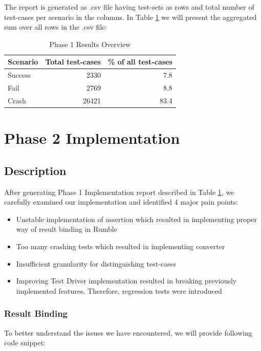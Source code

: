 The report is generated as .csv file having test-sets as rows and total number of test-cases per scenario in the columns. In Table \ref{tab:Phase1_ResultTable} we will present the aggregated sum over all rows in the .csv file:

\begin{table}[h!]
	\centering
	\begin{tabular}{|l|r|r|}
		\hline
		\multicolumn{1}{|c|}{Scenario} & \multicolumn{1}{c|}{Total test-cases} & \multicolumn{1}{c|}{\% of all test-cases} \\ \hline
		Success                        & 2330                                  & 7.8                                       \\ \hline
		Fail                           & 2769                                  & 8.8                                       \\ \hline
		Crash                          & 26421                                 & 83.4                                      \\ \hline
	\end{tabular}
 	\caption{Phase 1 Results Overview}
 	\label{tab:Phase1_ResultTable}
\end{table}

\section{Phase 2 Implementation}
\subsection{Description}
\label{Phase2_Description}
After generating Phase 1 Implementation report described in Table \ref{tab:Phase1_ResultTable}, we carefully examined our implementation and identified 4 major pain points:
\begin{itemize}
	\item Unstable implementation of assertion which resulted in implementing proper way of result binding in Rumble
	\item Too many crashing tests which resulted in implementing converter
	\item Insufficient granularity for distinguishing test-cases
	\item Improving Test Driver implementation resulted in breaking previously implemented features. Therefore, regression tests were introduced
\end{itemize}

\subsubsection{Result Binding}
To better understand the issues we have encountered, we will provide following code snippet:


